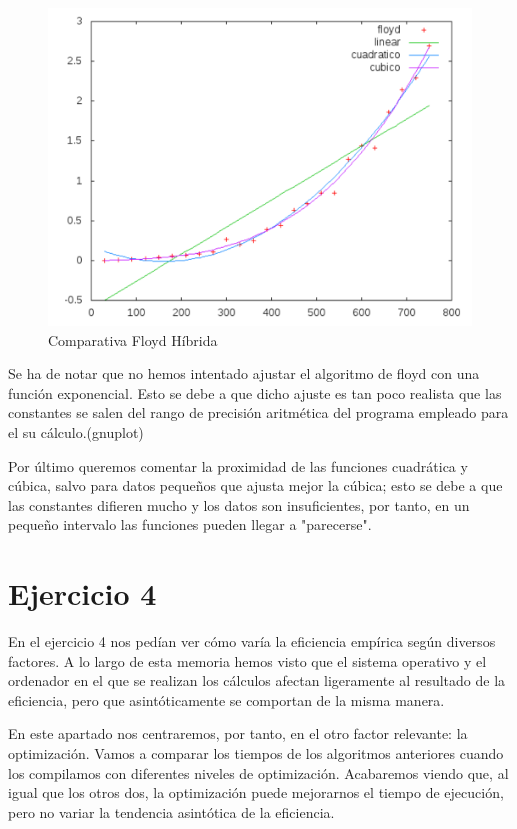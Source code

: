 \documentclass[a4paper, 11pt]{article}
\begin{document}
\begin{figure}[H]\includegraphics[width=13cm]{img/floyd_hibrida.pdf} \centering
	\caption{Comparativa Floyd Híbrida}\end{figure}

\begin{framed}
	Se ha de notar que no hemos intentado ajustar el algoritmo de floyd con una función exponencial. Esto se debe a que dicho ajuste es tan poco realista que las constantes se salen del rango de precisión aritmética del programa empleado para el su cálculo.(gnuplot)
\end{framed}


Por último queremos comentar la proximidad de las funciones cuadrática y cúbica, salvo para datos pequeños que ajusta mejor la cúbica; esto se debe a que las constantes difieren mucho y los datos son insuficientes, por tanto, en un pequeño intervalo las funciones pueden llegar a "parecerse".

\newpage
\section{Ejercicio 4}

En el ejercicio 4 nos pedían ver cómo varía la eficiencia empírica según diversos factores. A lo largo de esta memoria hemos visto que el sistema operativo y el ordenador en el que se realizan los cálculos afectan ligeramente al resultado de la eficiencia, pero que asintóticamente se comportan de la misma manera.

En este apartado nos centraremos, por tanto, en el otro factor relevante: la optimización. Vamos a comparar los tiempos de los algoritmos anteriores cuando los compilamos con diferentes niveles de optimización. Acabaremos viendo que, al igual que los otros dos, la optimización puede mejorarnos el tiempo de ejecución, pero no variar la tendencia asintótica de la eficiencia.
\end{document}
